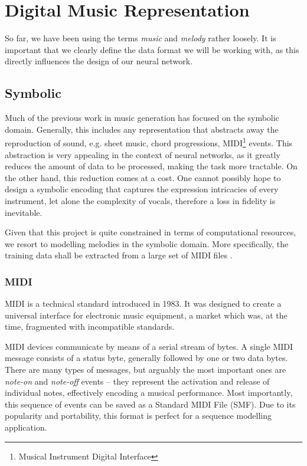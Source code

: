 \documentclass[../../report.tex]{subfiles}
\begin{document}
\section{Digital Music Representation}

So far, we have been using the terms \emph{music} and \emph{melody} rather
loosely. It is important that we clearly define the data format we will be
working with, as this directly influences the design of our neural network.

\subsection{Symbolic}

Much of the previous work in music generation has focused on the symbolic
domain. Generally, this includes any representation that abstracts away the
reproduction of sound, e.g. sheet music, chord progressions,
MIDI\footnote{Musical Instrument Digital Interface} events. This abstraction is
very appealing in the context of neural networks, as it greatly reduces the
amount of data to be processed, making the task more tractable. On the other
hand, this reduction comes at a cost. One cannot possibly hope to design a
symbolic encoding that captures the expression intricacies of every instrument,
let alone the complexity of vocals, therefore a loss in fidelity is inevitable.
\cite{Dieleman2020}

Given that this project is quite constrained in terms of computational
resources, we resort to modelling melodies in the symbolic domain. More
specifically, the training data shall be extracted from a large set of MIDI
files .

\subsubsection{MIDI}
MIDI is a technical standard introduced in 1983. It was designed to create a
universal interface for electronic music equipment, a market which was, at the
time, fragmented with incompatible standards.

MIDI devices communicate by means of a serial stream of bytes. A single MIDI
message consists of a status byte, generally followed by one or two data bytes.
There are many types of messages, but arguably the most important ones are
\emph{note-on} and \emph{note-off} events -- they represent the activation and
release of individual notes, effectively encoding a musical performance. Most
importantly, this sequence of events can be saved as a Standard MIDI File (SMF).
Due to its popularity and portability, this format is perfect for a sequence
modelling application. \cite{MIDI2015Messages, MIDI2015Files}
\end{document}
